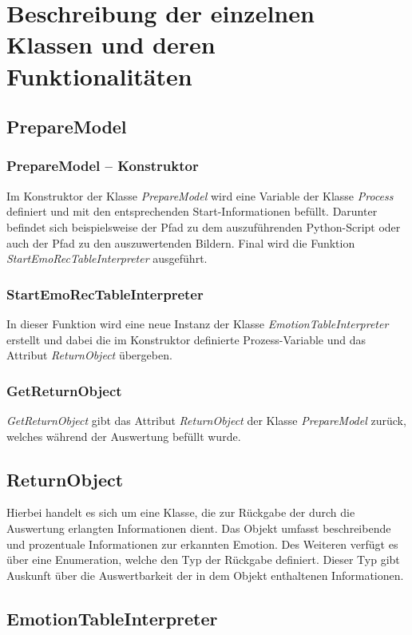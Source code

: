 \documentclass[10pt,a4paper]{report}
\begin{document}
\section{Beschreibung der einzelnen Klassen und deren Funktionalitäten}
\subsection{PrepareModel}
\subsubsection{PrepareModel – Konstruktor}
Im Konstruktor der Klasse \textit{PrepareModel} wird eine Variable der Klasse \textit{Process} definiert und mit den entsprechenden Start-Informationen befüllt. Darunter befindet sich beispielsweise der Pfad zu dem auszuführenden Python-Script oder auch der Pfad zu den auszuwertenden Bildern. Final wird die Funktion \textit{StartEmoRecTableInterpreter} ausgeführt.
\subsubsection{StartEmoRecTableInterpreter}
In dieser Funktion wird eine neue Instanz der Klasse \textit{EmotionTableInterpreter} erstellt und dabei die im Konstruktor definierte Prozess-Variable und das Attribut \textit{ReturnObject} übergeben.
\subsubsection{GetReturnObject}
\textit{GetReturnObject} gibt das Attribut \textit{ReturnObject} der Klasse \textit{PrepareModel} zurück, welches während der Auswertung befüllt wurde. 
\subsection{ReturnObject}
Hierbei handelt es sich um eine Klasse, die zur Rückgabe der durch die Auswertung erlangten Informationen dient. Das Objekt umfasst beschreibende und prozentuale Informationen zur erkannten Emotion. Des Weiteren verfügt es über eine Enumeration, welche den Typ der Rückgabe definiert. Dieser Typ gibt Auskunft über die Auswertbarkeit der in dem Objekt enthaltenen Informationen.
\subsection{EmotionTableInterpreter}
\end{document}
